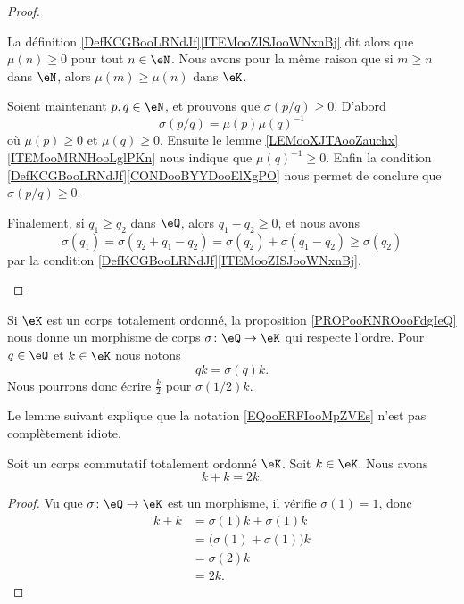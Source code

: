 \begin{proof}
\begin{subproof}
    La définition \ref{DefKCGBooLRNdJf}\ref{ITEMooZISJooWNxnBj} dit alors que \( \mu(n)\geq 0\) pour tout \( n\in \eN\). Nous avons pour la même raison que si \( m\geq n\) dans \( \eN\), alors \( \mu(m)\geq\mu(n)\) dans \( \eK\).

        Soient maintenant \( p,q\in \eN\), et prouvons que \( \sigma(p/q)\geq 0\). D'abord
        \begin{equation}
            \sigma(p/q)=\mu(p)\mu(q)^{-1}
        \end{equation}
        où \( \mu(p)\geq 0\) et \( \mu(q)\geq 0\). Ensuite le lemme \ref{LEMooXJTAooZauchx}\ref{ITEMooMRNHooLglPKn} nous indique que \( \mu(q)^{-1}\geq 0\). Enfin la condition \ref{DefKCGBooLRNdJf}\ref{CONDooBYYDooElXgPO} nous permet de conclure que \( \sigma(p/q)\geq 0\).

        Finalement, si \( q_1\geq q_2\) dans \( \eQ\), alors \( q_1-q_2\geq 0\), et nous avons
        \begin{equation}
            \sigma(q_1)=\sigma(q_2+q_1-q_2)=\sigma(q_2)+\sigma(q_1-q_2)\geq \sigma(q_2)
        \end{equation}
        par la condition \ref{DefKCGBooLRNdJf}\ref{ITEMooZISJooWNxnBj}.
    \end{subproof}
\end{proof}


\begin{normaltext}      \label{NORMooJRRZooTwTVYG}
    Si \( \eK\) est un corps totalement ordonné, la proposition \ref{PROPooKNROooFdgIeQ} nous donne un morphisme de corps \( \sigma\colon \eQ\to \eK\) qui respecte l'ordre. Pour \( q\in \eQ\) et \( k\in \eK\) nous notons
    \begin{equation}        \label{EQooERFIooMpZVEs}
        qk=\sigma(q)k.
    \end{equation}
    Nous pourrons donc écrire \( \frac{ k }{2}\) pour \( \sigma(1/2)k\).
\end{normaltext}

Le lemme suivant explique que la notation \eqref{EQooERFIooMpZVEs} n'est pas complètement idiote.
\begin{lemma}       \label{LEMooWIONooGTKfcJ}
    Soit un corps commutatif totalement ordonné \( \eK\). Soit \( k\in \eK\). Nous avons
    \begin{equation}
        k+k=2k.
    \end{equation}
\end{lemma}

\begin{proof}
    Vu que \(  \sigma\colon \eQ\to \eK \) est un morphisme, il vérifie \( \sigma(1)=1\), donc
    \begin{subequations}
        \begin{align}
            k+k&=\sigma(1)k+\sigma(1)k\\
            &=\big( \sigma(1)+\sigma(1) \big)k\\
            &=\sigma(2)k\\
            &=2k.
        \end{align}
    \end{subequations}
\end{proof}


